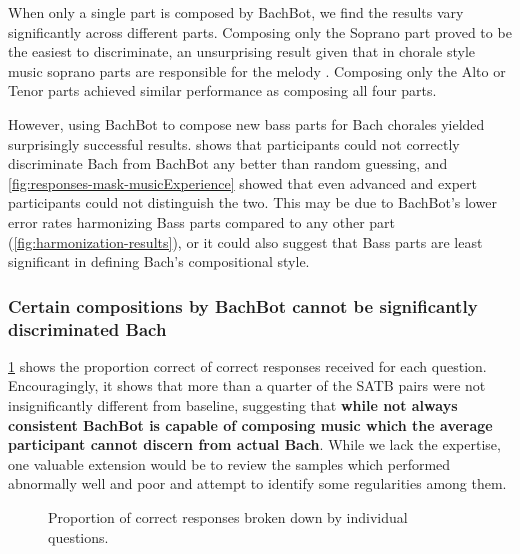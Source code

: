 When only a single part is composed by BachBot, we find the results vary
significantly across different parts. Composing only the Soprano part proved to be
the easiest to discriminate, an unsurprising result given that in chorale style
music soprano parts are responsible for the melody \citep{denny1960oxford}.
Composing only the Alto or Tenor parts achieved similar performance as composing
all four parts.

However, using BachBot to compose new bass parts for Bach chorales yielded
surprisingly successful results.  shows that
participants could not correctly discriminate Bach from BachBot any better than
random guessing, and \cref{fig:responses-mask-musicExperience} showed that even
advanced and expert participants could not distinguish the two. This may be due
to BachBot's lower error rates harmonizing Bass parts compared to any other
part (\vref{fig:harmonization-results}), or it could also suggest that Bass
parts are least significant in defining Bach's compositional style.

\subsubsection{Certain compositions by BachBot cannot be significantly discriminated Bach}

\cref{fig:responses-name} shows the proportion correct of correct responses
received for each question. Encouragingly, it shows that more than a quarter of
the SATB pairs were not insignificantly different from baseline, suggesting
that \textbf{while not always consistent BachBot is capable of composing music
which the average participant cannot discern from actual Bach}. While we lack the
expertise, one valuable extension would be to review the samples which performed
abnormally well and poor and attempt to identify some regularities among them.

\begin{figure}[tb]
  \centering
  
  \caption{Proportion of correct responses broken down by individual questions.}
  \label{fig:responses-name}
\end{figure}



